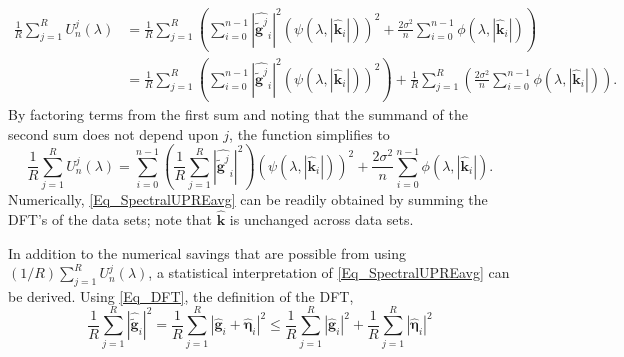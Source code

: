\documentclass[12pt]{article}
\newcommand{\gdis}{\mathbf{g}}
\newcommand{\gnoise}{\widetilde{\mathbf{g}}}
\newcommand{\kdis}{\mathbf{k}}
\newcommand{\regparam}{\lambda}
\newcommand{\filt}{\phi}
\newcommand{\mfilt}{\psi}
\newcommand{\noiseSD}{\sigma}	%
\newcommand{\noise}{\bm{\eta}}	%
\newcommand{\U}{U}	%
\begin{document}
\begin{align*}
\frac{1}{R}\sum_{j=1}^R \U_n^j(\regparam) &= \frac{1}{R}\sum_{j=1}^R \left(\sum_{i = 0}^{n-1} |\widehat{\gnoise^j}_i|^2(\mfilt(\regparam,|\widehat{\kdis}_i|))^2 + \frac{2\noiseSD^2}{n}\sum_{i = 0}^{n-1} \filt(\regparam,|\widehat{\kdis}_i|)\right) \\
&= \frac{1}{R}\sum_{j=1}^R \left(\sum_{i = 0}^{n-1} |\widehat{\gnoise^j}_i|^2(\mfilt(\regparam,|\widehat{\kdis}_i|))^2\right) + \frac{1}{R}\sum_{j=1}^R \left(\frac{2\noiseSD^2}{n}\sum_{i = 0}^{n-1} \filt(\regparam,|\widehat{\kdis}_i|)\right).
\end{align*}
By factoring terms from the first sum and noting that the summand of the second sum does not depend upon $j$, the function simplifies to
\begin{equation}
\frac{1}{R}\sum_{j=1}^R \U_n^j(\regparam) =  \sum_{i = 0}^{n-1} \left(\frac{1}{R}\sum_{j=1}^R |\widehat{\gnoise^j}_i|^2\right)(\mfilt(\regparam,|\widehat{\kdis}_i|))^2 + \frac{2\noiseSD^2}{n}\sum_{i = 0}^{n-1} \filt(\regparam,|\widehat{\kdis}_i|).
\label{Eq_SpectralUPREavg}
\end{equation}
Numerically, \eqref{Eq_SpectralUPREavg} can be readily obtained by summing the DFT's of the data sets; note that $\widehat{\kdis}$ is unchanged across data sets. \par
In addition to the numerical savings that are possible from using $(1/R)\sum_{j=1}^R \U_n^j(\regparam)$, a statistical interpretation of \eqref{Eq_SpectralUPREavg} can be derived. Using \eqref{Eq_DFT}, the definition of the DFT,
\[\frac{1}{R}\sum_{j=1}^R |\widehat{\gnoise}_i|^2 = \frac{1}{R}\sum_{j=1}^R |\widehat{\gdis}_i + \widehat{\noise}_i|^2 \leq \frac{1}{R}\sum_{j=1}^R |\widehat{\gdis}_i|^2  + \frac{1}{R}\sum_{j=1}^R |\widehat{\noise}_i|^2 \] 
\end{document}
